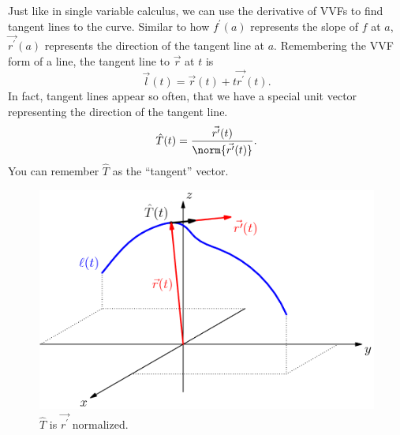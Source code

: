 \noindent
Just like in single variable calculus, we can use the derivative of VVFs to find tangent lines to the curve.
Similar to how $f^{\prime}(a)$ represents the slope of $f$ at $a$, $\vec{r^\prime}(a)$ represents the direction of the tangent line at $a$.
Remembering the VVF form of a line, the tangent line to $\vec{r}$ at $t$ is 
\begin{equation*}
	\vec{l}(t)=\vec{r}(t)+t\vec{r^\prime}(t).
\end{equation*}
In fact, tangent lines appear so often, that we have a special unit vector representing the direction of the tangent line.
\begin{equation*}
	\hat{T}(t) = \frac{\vec{r^\prime}(t)}{\norm{\vec{r^\prime}(t)}}.
\end{equation*}
You can remember $\hat{T}$ as the ``tangent'' vector.

\begin{figure}[H]
	\centering
	\includegraphics[scale=0.33]{./vectorValuedFunctions/TangentVector.png}
	\caption{$\hat{T}$ is $\vec{r^\prime}$ normalized.}
\end{figure}